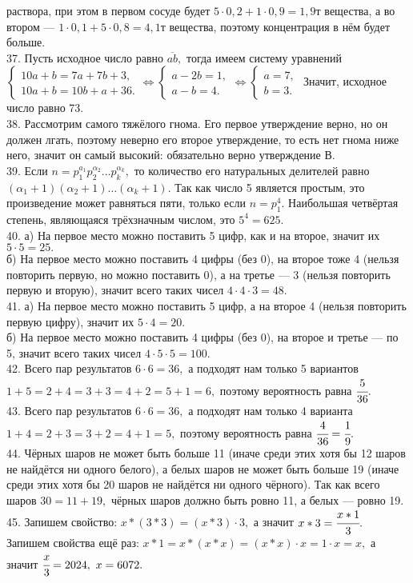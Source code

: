 раствора, при этом в первом сосуде будет $5\cdot0,2+1\cdot0,9=1,9$т вещества, а во втором --- $1\cdot0,1+5\cdot0,8=4,1$т вещества, поэтому концентрация в нём будет больше.\\
37. Пусть исходное число равно $\overline{ab},$ тогда имеем систему уравнений $\begin{cases}10a+b=7a+7b+3,\\ 10a+b=10b+a+36.\end{cases}\Leftrightarrow
\begin{cases}a-2b=1,\\ a-b=4.\end{cases}\Leftrightarrow
\begin{cases}a=7,\\ b=3.\end{cases}$ Значит, исходное число равно 73.\\
38. Рассмотрим самого тяжёлого гнома. Его первое утверждение верно, но он должен лгать, поэтому неверно его второе утверждение, то есть нет гнома ниже него, значит он самый высокий: обязательно верно утверждение В.\\
39. Если $n=p_1^{a_1}p_2^{\alpha_2}\ldots p_k^{\alpha_k},$ то количество его натуральных делителей равно $(\alpha_1+1)(\alpha_2+1)\ldots (\alpha_k+1).$ Так как число 5 является простым, это произведение может равняться пяти, только если $n=p_1^4.$ Наибольшая четвёртая степень, являющаяся трёхзначным числом, это $5^4=625.$\\
40. а) На первое место можно поставить 5 цифр, как и на второе, значит их $5\cdot5=25.$\\
б) На первое место можно поставить 4 цифры (без 0), на второе тоже 4 (нельзя повторить первую, но можно поставить 0), а на третье --- 3 (нельзя повторить первую и вторую), значит всего таких чисел $4\cdot4\cdot3=48.$\\
41. а) На первое место можно поставить 5 цифр, а на второе 4 (нельзя повторить первую цифру), значит их $5\cdot4=20.$\\
б) На первое место можно поставить 4 цифры (без 0), на второе и третье --- по 5, значит всего таких чисел $4\cdot5\cdot5=100.$\\
42. Всего пар результатов $6\cdot6=36,$ а подходят нам только 5 вариантов $1+5=2+4=3+3=4+2=5+1=6,$ поэтому вероятность равна $\cfrac{5}{36}.$\\
43. Всего пар результатов $6\cdot6=36,$ а подходят нам только 4 варианта $1+4=2+3=3+2=4+1=5,$ поэтому вероятность равна $\cfrac{4}{36}=\cfrac{1}{9}.$\\
44. Чёрных шаров не может быть больше 11 (иначе среди этих хотя бы 12 шаров не найдётся ни одного белого), а белых шаров не может быть больше 19 (иначе среди этих хотя бы 20 шаров не найдётся ни одного чёрного). Так как всего шаров $30=11+19,$ чёрных шаров должно быть ровно 11, а белых --- ровно 19.\\
45. Запишем свойство: $x*(3*3)=(x*3)\cdot3,$ а значит $x*3=\cfrac{x*1}{3}.$ Запишем свойства ещё раз: $x*1=x*(x*x)=(x*x)\cdot x=1\cdot x=x,$ а значит
$\cfrac{x}{3}=2024,\ x=6072.$
\newpage
